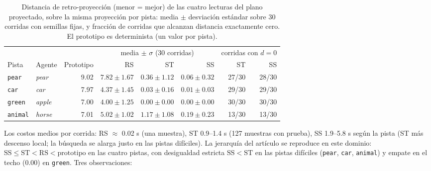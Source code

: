 \begin{table}[H]
\centering
\caption{Distancia de retro-proyección (menor = mejor) de las cuatro lecturas del
plano proyectado, sobre la misma proyección por pista: media $\pm$ desviación
estándar sobre 30 corridas con semillas fijas, y fracción de corridas que alcanzan
distancia exactamente cero. El prototipo es determinista (un valor por pista).}
\label{tab:pista}
\begin{tabular}{llrrrrrr}
\toprule
 & & & \multicolumn{3}{c}{media $\pm$ $\sigma$ (30 corridas)}
 & \multicolumn{2}{c}{corridas con $d = 0$} \\
\cmidrule(lr){4-6}\cmidrule(lr){7-8}
Pista & Agente & Prototipo & RS & ST & SS & ST & SS \\
\midrule
\texttt{pear}   & \textit{pear}  & 9.02 & $7.82 \pm 1.67$ & $0.36 \pm 1.12$ & $0.06 \pm 0.32$ & 27/30 & 28/30 \\
\texttt{car}    & \textit{car}   & 7.97 & $4.37 \pm 1.45$ & $0.03 \pm 0.16$ & $0.01 \pm 0.03$ & 29/30 & 29/30 \\
\texttt{green}  & \textit{apple} & 7.00 & $4.00 \pm 1.25$ & $0.00 \pm 0.00$ & $0.00 \pm 0.00$ & 30/30 & 30/30 \\
\texttt{animal} & \textit{horse} & 7.01 & $5.02 \pm 1.02$ & $1.17 \pm 1.08$ & $0.19 \pm 0.23$ & 13/30 & 13/30 \\
\bottomrule
\end{tabular}
\end{table}

Los costos medios por corrida: RS $\approx$ 0.02 s (una muestra), ST 0.9--1.4 s
(127 muestras con prueba), SS 1.9--5.8 s según la pista (ST más descenso local; la
búsqueda se alarga justo en las pistas difíciles).
La jerarquía del artículo \cite{morales2025missing} se reproduce en este dominio:
$\mathrm{SS} \le \mathrm{ST} < \mathrm{RS} < \text{prototipo}$ en las cuatro pistas,
con desigualdad estricta $\mathrm{SS} < \mathrm{ST}$ en las pistas difíciles
(\texttt{pear}, \texttt{car}, \texttt{animal}) y empate en el techo ($0.00$) en
\texttt{green}.
Tres observaciones:

